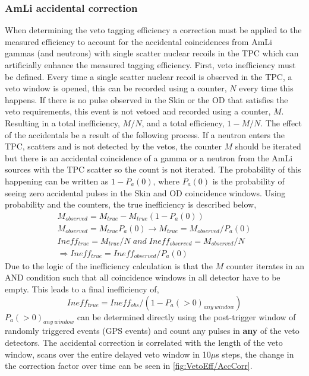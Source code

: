 \subsubsection{AmLi accidental correction}\label{sec:Veto/AmLiAccCorrection}
When determining the veto tagging efficiency a correction must be applied to the measured efficiency to account for the accidental coincidences from AmLi gammas (and neutrons) with single scatter nuclear recoils in the TPC which can artificially enhance the measured tagging efficiency.
First, veto inefficiency must be defined. Every time a single scatter nuclear recoil is observed in the TPC, a veto window is opened, this can be recorded using a counter, $N$ every time this happens.
If there is no pulse observed in the Skin or the OD that satisfies the veto requirements, this event is not vetoed and recorded using a counter, $M$. Resulting in a total inefficiency, $M/N$, and a total efficiency, $1-M/N$.
The effect of the accidentals be a result of the following process.
If a neutron enters the TPC, scatters and is not detected by the vetos, the counter $M$ should be iterated but there is an accidental coincidence of a gamma or a neutron from the AmLi sources with the TPC scatter so the count is not iterated.
The probability of this happening can be written as $1-P_a(0)$, where $P_a(0)$ is the probability of seeing zero accidental pulses in the Skin and OD coincidence windows.
Using probability and the counters, the true inefficiency is described below,
\begin{gather*}
	M_{observed}=M_{true}-M_{true}(1-P_a(0)) \\
	M_{observed}=M_{true}P_a(0)\rightarrow M_{true}=M_{observed}/P_a(0)\\
	Ineff_{true}=M_{true}/N\;and\;Ineff_{observed}=M_{observed}/N\\
	\Rightarrow Ineff_{true}=Ineff_{observed}/P_a(0)
\end{gather*}
Due to the logic of the inefficiency calculation is that the $M$ counter iterates in an AND condition such that all coincidence windows in all detector have to be empty.
This leads to a final inefficiency of,
\begin{equation}
	Ineff_{true} = Ineff_{obs}  / (1 - P_a(>0)_{any\:window})
\end{equation}
$P_a(>0)_{any\:window}$ can be determined directly using the post-trigger window of randomly triggered events (GPS events) and count any pulses in \textbf{any} of the veto detectors.
The accidental correction is correlated with the length of the veto window, scans over the entire delayed veto window in 10$\mu$s steps, the change in the correction factor over time can be seen in \autoref{fig:VetoEff/AccCorr}.
